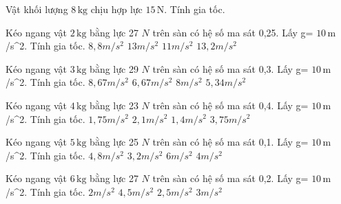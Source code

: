 \begin{bt}
Vật khối lượng $8\,\text{kg}$ chịu hợp lực $15\,\text{N}$. Tính gia tốc.
\end{bt}

\begin{ex}
Kéo ngang vật $2\,\text{kg}$ bằng lực 27 $N$ trên sàn có hệ số ma sát 0,25. Lấy g= $10\,\text{m}$ /s^2. Tính gia tốc.
\choice
{$8,8 m/s^2$}
{$13 m/s^2$}
{\True $11 m/s^2$}
{$13,2 m/s^2$}
\end{ex}

\begin{ex}
Kéo ngang vật $3\,\text{kg}$ bằng lực 29 $N$ trên sàn có hệ số ma sát 0,3. Lấy g= $10\,\text{m}$ /s^2. Tính gia tốc.
\choice
{$8,67 m/s^2$}
{\True $6,67 m/s^2$}
{$8 m/s^2$}
{$5,34 m/s^2$}
\end{ex}

\begin{ex}
Kéo ngang vật $4\,\text{kg}$ bằng lực 23 $N$ trên sàn có hệ số ma sát 0,4. Lấy g= $10\,\text{m}$ /s^2. Tính gia tốc.
\choice
{\True $1,75 m/s^2$}
{$2,1 m/s^2$}
{$1,4 m/s^2$}
{$3,75 m/s^2$}
\end{ex}

\begin{ex}
Kéo ngang vật $5\,\text{kg}$ bằng lực 25 $N$ trên sàn có hệ số ma sát 0,1. Lấy g= $10\,\text{m}$ /s^2. Tính gia tốc.
\choice
{$4,8 m/s^2$}
{$3,2 m/s^2$}
{$6 m/s^2$}
{\True $4 m/s^2$}
\end{ex}

\begin{ex}
Kéo ngang vật $6\,\text{kg}$ bằng lực 27 $N$ trên sàn có hệ số ma sát 0,2. Lấy g= $10\,\text{m}$ /s^2. Tính gia tốc.
\choice
{$2 m/s^2$}
{$4,5 m/s^2$}
{\True $2,5 m/s^2$}
{$3 m/s^2$}
\end{ex}

